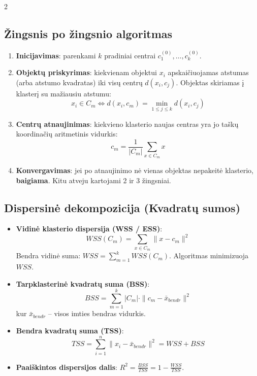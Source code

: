 \documentclass[9pt,a4paper]{article}
\begin{document}
\begin{multicols*}{2}
\subsection{Žingsnis po žingsnio algoritmas}
\begin{enumerate}
    \item \textbf{Inicijavimas}: parenkami $k$ pradiniai centrai $c_1^{(0)}, \dots, c_k^{(0)}$.
    \item \textbf{Objektų priskyrimas}: kiekvienam objektui $x_i$ apskaičiuojamas atstumas (arba atstumo kvadratas) iki visų centrų $d(x_i, c_j)$. Objektas skiriamas į klasterį su mažiausiu atstumu:
    \begin{equation*}
        x_i \in C_m \iff d(x_i, c_m) = \min_{1 \le j \le k} d(x_i, c_j)
    \end{equation*}
    \item \textbf{Centrų atnaujinimas}: kiekvieno klasterio naujas centras yra jo taškų koordinačių aritmetinis vidurkis:
    \begin{equation*}
        c_m = \frac{1}{|C_m|} \sum_{x \in C_m} x
    \end{equation*}
    \item \textbf{Konvergavimas}: jei po atnaujinimo nė vienas objektas nepakeitė klasterio, \textbf{baigiama}. Kitu atveju kartojami 2 ir 3 žingsniai.
\end{enumerate}

\subsection{Dispersinė dekompozicija (Kvadratų sumos)}
\begin{itemize}
    \item \textbf{Vidinė klasterio dispersija (WSS / ESS)}:
    \begin{equation*}
        WSS(C_m) = \sum_{x \in C_m} \|x - c_m\|^2
    \end{equation*}
    Bendra vidinė suma: $WSS = \sum_{m=1}^k WSS(C_m)$. Algoritmas minimizuoja $WSS$.
    \item \textbf{Tarpklasterinė kvadratų suma (BSS)}:
    \begin{equation*}
        BSS = \sum_{m=1}^k |C_m| \cdot \|c_m - \bar{x}_{bendr}\|^2
    \end{equation*}
    kur $\bar{x}_{bendr}$ -- visos imties bendras vidurkis.
    \item \textbf{Bendra kvadratų suma (TSS)}:
    \begin{equation*}
        TSS = \sum_{i=1}^n \|x_i - \bar{x}_{bendr}\|^2 = WSS + BSS
    \end{equation*}
    \item \textbf{Paaiškintos dispersijos dalis}: $R^2 = \frac{BSS}{TSS} = 1 - \frac{WSS}{TSS}$.
\end{itemize}


\end{multicols*}
\end{document}
